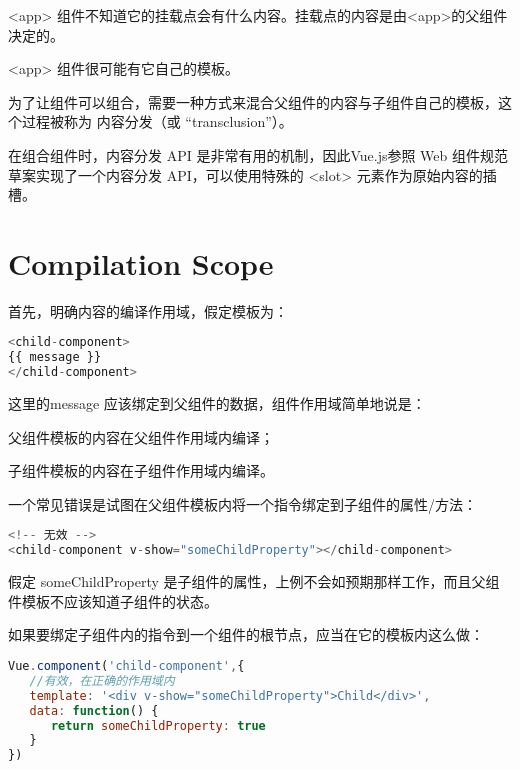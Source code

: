 \begin{compactitem}
\item <app> 组件不知道它的挂载点会有什么内容。挂载点的内容是由<app>的父组件决定的。
\item <app> 组件很可能有它自己的模板。
\end{compactitem}

为了让组件可以组合，需要一种方式来混合父组件的内容与子组件自己的模板，这个过程被称为 内容分发（或 “transclusion”）。

在组合组件时，内容分发 API 是非常有用的机制，因此Vue.js参照 Web 组件规范草案实现了一个内容分发 API，可以使用特殊的 <slot> 元素作为原始内容的插槽。


\section{Compilation Scope}

首先，明确内容的编译作用域，假定模板为：


\begin{lstlisting}[language=JavaScript]
<child-component>
{{ message }}
</child-component>
\end{lstlisting}

这里的message 应该绑定到父组件的数据，组件作用域简单地说是：

\begin{compactitem}
\item 父组件模板的内容在父组件作用域内编译；
\item 子组件模板的内容在子组件作用域内编译。
\end{compactitem}

一个常见错误是试图在父组件模板内将一个指令绑定到子组件的属性/方法：


\begin{lstlisting}[language=JavaScript]
<!-- 无效 -->
<child-component v-show="someChildProperty"></child-component>
\end{lstlisting}

假定 someChildProperty 是子组件的属性，上例不会如预期那样工作，而且父组件模板不应该知道子组件的状态。

如果要绑定子组件内的指令到一个组件的根节点，应当在它的模板内这么做：

\begin{lstlisting}[language=JavaScript]
Vue.component('child-component',{
   //有效，在正确的作用域内
   template: '<div v-show="someChildProperty">Child</div>',
   data: function() {
      return someChildProperty: true
   }
})
\end{lstlisting}

